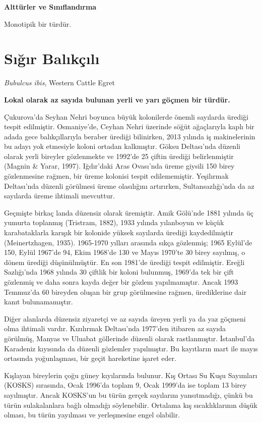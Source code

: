\documentclass[
  a4paper,
  DIV=11,
  numbers=noendperiod]{scrreprt}
\begin{document}
\textbf{Alttürler ve Sınıflandırma}

Monotipik bir türdür.

\section{Sığır
Balıkçılı}\label{sux131ux11fux131r-balux131kuxe7ux131lux131}

\emph{Bubulcus ibis}, Western Cattle Egret

\textbf{Lokal olarak az sayıda bulunan yerli ve yarı göçmen bir türdür.}

Çukurova'da Seyhan Nehri boyunca büyük kolonilerde önemli sayılarda
ürediği tespit edilmiştir. Osmaniye'de, Ceyhan Nehri üzerinde söğüt
ağaçlarıyla kaplı bir adada gece balıkçıllarıyla beraber ürediği
bilinirken, 2013 yılında iş makinelerinin bu adayı yok etmesiyle koloni
ortadan kalkmıştır. Göksu Deltası'nda düzenli olarak yerli bireyler
gözlenmekte ve 1992'de 25 çiftin ürediği belirlenmiştir (Magnin \&
Yarar, 1997). Iğdır'daki Aras Ovası'nda üreme giysili 150 birey
gözlenmesine rağmen, bir üreme kolonisi tespit edilememiştir. Yeşilırmak
Deltası'nda düzenli görülmesi üreme olasılığını artırırken,
Sultansazlığı'nda da az sayılarda üreme ihtimali mevcuttur.

Geçmişte birkaç landa düzensiz olarak üremiştir. Amik Gölü'nde 1881
yılında üç yumurta toplanmış (Tristram, 1882), 1933 yılında yılanboyun
ve küçük karabataklarla karışık bir kolonide yüksek sayılarda ürediği
kaydedilmiştir (Meinertzhagen, 1935). 1965-1970 yılları arasında sıkça
gözlenmiş; 1965 Eylül'de 150, Eylül 1967'de 94, Ekim 1968'de 130 ve
Mayıs 1970'te 30 birey sayılmış, o dönem ürediği düşünülmüştür. En son
1981'de ürediği tespit edilmiştir. Ereğli Sazlığı'nda 1968 yılında 30
çiftlik bir koloni bulunmuş, 1969'da tek bir çift gözlenmiş ve daha
sonra kayda değer bir gözlem yapılmamıştır. Ancak 1993 Temmuz'da 60
bireyden oluşan bir grup görülmesine rağmen, ürediklerine dair kanıt
bulunamamıştır.

Diğer alanlarda düzensiz ziyaretçi ve az sayıda üreyen yerli ya da yaz
göçmeni olma ihtimali vardır. Kızılırmak Deltası'nda 1977'den itibaren
az sayıda görülmüş, Manyas ve Uluabat göllerinde düzenli olarak
rastlanmıştır. İstanbul'da Karadeniz kıyısında da düzenli gözlemler
yapılmıştır. Bu kayıtların mart ile mayıs ortasında yoğunlaşması, bir
geçit hareketine işaret eder.

Kışlayan bireylerin çoğu güney kıyılarında bulunur. Kış Ortası Su Kuşu
Sayımları (KOSKS) sırasında, Ocak 1996'da toplam 9, Ocak 1999'da ise
toplam 13 birey sayılmıştır. Ancak KOSKS'un bu türün gerçek sayılarını
yansıtmadığı, çünkü bu türün sulakalanlara bağlı olmadığı söylenebilir.
Ortalama kış sıcaklıklarının düşük olması, bu türün yayılması ve
yerleşmesine engel olabilir.
\end{document}
